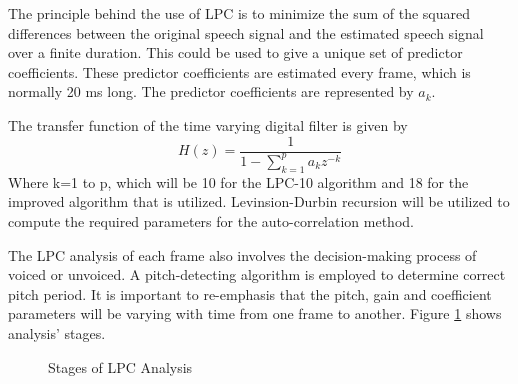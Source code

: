 \documentclass[12pt, a4paper, twoside]{report}
\begin{document}
The principle behind the use of LPC is to minimize the sum of the squared differences between the original speech signal and the estimated speech signal over a finite duration. This could be used to give a unique set of predictor coefficients. These predictor coefficients are estimated every frame, which is normally 20 ms long. The predictor coefficients are represented by $a_k$.

The transfer function of the time varying
digital filter is given by
\begin{equation*}
H(z) = \frac{1}{1-\sum_{k=1}^{p} a_k z^{-k}}
\end{equation*}
Where k=1 to p, which will be 10 for the LPC-10 algorithm and 18 for the improved algorithm that is utilized. Levinsion-Durbin recursion will be utilized to compute the required parameters for the auto-correlation method. 

The LPC analysis of each frame also involves the decision-making process of voiced or unvoiced. A pitch-detecting algorithm is employed to determine correct pitch period. It is
important to re-emphasis that the pitch, gain and coefficient parameters will be varying with time from one frame to another. Figure \ref{fig:lpc_analysis_stages} shows analysis' stages.

\begin{figure}[h!]
\centering
{}
\caption{Stages of LPC Analysis}
\label{fig:lpc_analysis_stages}
\end{figure}
\end{document}
